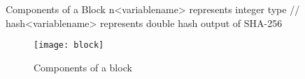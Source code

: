 \documentclass{beamer}
\begin{document}
\begin{frame}{Components of a Block}
n<variablename> represents integer type //
hash<variablename> represents double hash output of SHA-256
\begin{figure}[H]\centering 
\texttt{[image: block]}
\caption{Components of a block}
\end{figure}
    
\end{frame}



\end{document}
